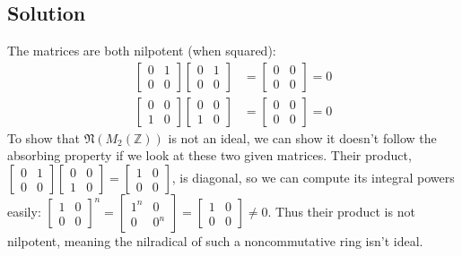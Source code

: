 \documentclass[fleqn]{article}
\begin{document}
        \subsection{Solution}
        The matrices are both nilpotent (when squared):
        \begin{align}
            \begin{bmatrix}
                0 & 1 \\
                0 & 0
            \end{bmatrix} \begin{bmatrix}
                0 & 1 \\
                0 & 0
            \end{bmatrix} &= \begin{bmatrix}
                0 & 0 \\
                0 & 0
            \end{bmatrix} = 0 \\
            \begin{bmatrix}
                0 & 0 \\
                1 & 0
            \end{bmatrix} \begin{bmatrix}
                0 & 0 \\
                1 & 0
            \end{bmatrix} &= \begin{bmatrix}
                0 & 0 \\
                0 & 0
            \end{bmatrix} = 0
        \end{align}
        To show that $\mathfrak{N}(M_2(\mathbb{Z}))$ is not an ideal, we can show it doesn't follow the absorbing property if we look at these two given matrices.  Their product, $\begin{bmatrix}
            0 & 1 \\
            0 & 0
        \end{bmatrix} \begin{bmatrix}
            0 & 0 \\
            1 & 0
        \end{bmatrix} = \begin{bmatrix}
            1 & 0 \\
            0 & 0
        \end{bmatrix}$, is diagonal, so we can compute its integral powers easily: $\begin{bmatrix}
            1 & 0 \\
            0 & 0
        \end{bmatrix}^n = \begin{bmatrix}
            1^n & 0 \\
            0 & 0^n
        \end{bmatrix} = \begin{bmatrix}
            1 & 0 \\
            0 & 0
        \end{bmatrix} \neq 0$.  Thus their product is not nilpotent, meaning the nilradical of such a noncommutative ring isn't ideal.
    
\end{document}
